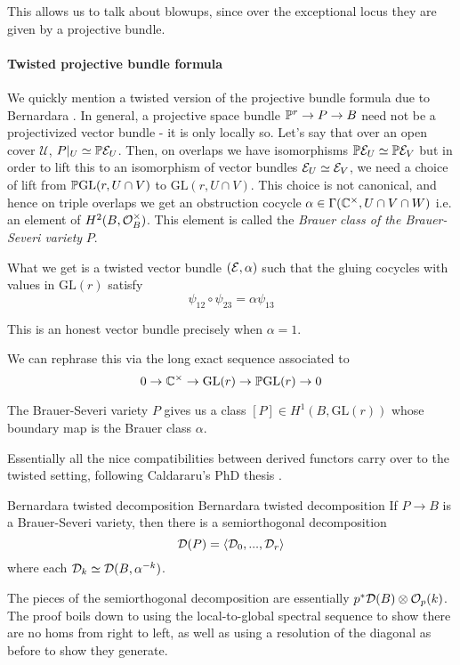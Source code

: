 This allows us to talk about blowups, since over the exceptional locus they are given by a projective bundle.

\paragraph*{Twisted projective bundle formula}
We quickly mention a twisted version of the projective bundle formula due to Bernardara \cite{bernardara_semiorthogonal_2005}. In general, a projective space bundle $\P^r \rightarrow P\rightarrow B$ need not be a projectivized vector bundle - it is only locally so. Let's say that over an open cover $\mathcal{U}$, $P|_U\simeq \P \calE_U$. Then, on overlaps we have isomorphisms $\P\calE_U \simeq \P \calE_V$ but in order to lift this to an isomorphism of vector bundles $\calE_U \simeq \calE_V$, we need a choice of lift from $\P\mathrm{GL}(r,U\cap V)$ to $\mathrm{GL}(r,U\cap V)$. This choice is not canonical, and hence on triple overlaps we get an obstruction cocycle $\alpha \in \Gamma(\C^\times, U\cap V \cap W)$ i.e. an element of $H^2(B,\O_B^\times)$. This element is called the \emph{Brauer class of the Brauer-Severi variety }$P$.

What we get is a twisted vector bundle $(\calE, \alpha)$ such that the gluing cocycles with values in $\mathrm{GL}(r)$ satisfy $$\psi_{12} \circ \psi_{23}=\alpha \psi_{13}$$

This is an honest vector bundle precisely when $\alpha=1$.

We can rephrase this via the long exact sequence associated to $$0\rightarrow \C^\times \rightarrow \mathrm{GL}(r)\rightarrow \P \mathrm{GL}(r)\rightarrow 0$$

The Brauer-Severi variety $P$ gives us a class $[P]\in H^1(B, \mathrm{GL}(r))$ whose boundary map is the Brauer class $\alpha$.

Essentially all the nice compatibilities between derived functors carry over to the twisted setting, following Caldararu's PhD thesis \cite{CaldararuThesis}.

\begin{proposition}{Bernardara twisted decomposition \cite{bernardara_semiorthogonal_2005}}{Bernardara twisted decomposition}
    If $P\rightarrow B$ is a Brauer-Severi variety, then there is a semiorthogonal decomposition $$\calD(P)=\langle \calD_0,..., \calD_r\rangle$$
    where each $\calD_k\simeq \calD(B,\alpha^{-k})$.
\end{proposition}

The pieces of the semiorthogonal decomposition are essentially $p^*\calD(B)\otimes \O_p(k)$. The proof boils down to using the local-to-global spectral sequence to show there are no homs from right to left, as well as using a resolution of the diagonal as before to show they generate.


